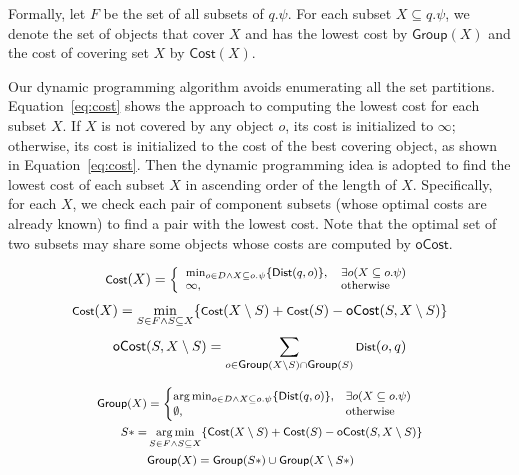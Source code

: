 \documentclass{sig-alternate}
\newcommand{\Dist}{\mbox{$\mathsf{Dist}$}\xspace}
\newcommand{\Cost}{\mbox{$\mathsf{Cost}$}}
\newcommand{\Group}{\mbox{$\mathsf{Group}$}}
\begin{document}
Formally, let $F$ be the set of all subsets of $q.\psi$.  For each
subset $X \subseteq q.\psi$, we denote the set of objects that cover
$X$ and has the lowest cost by \Group$(X)$ and the cost of covering
set $X$ by \Cost$(X)$.

Our dynamic programming algorithm avoids enumerating all the set
partitions. Equation~\ref{eq:cost} shows the approach to computing
the lowest cost for each subset $X$. If $X$ is
not covered by any object $o$, its cost is initialized to
$\infty$; otherwise, its cost is initialized to the cost of the best covering
object, as shown in Equation~\ref{eq:cost}. Then the
dynamic programming idea is adopted to find the lowest cost of each
subset $X$ in ascending order of the length of $X$. Specifically,
for each $X$, we check each pair of component subsets (whose optimal
costs are already known) to find a pair with the lowest cost. Note
that the optimal set of two subsets may share some objects whose
costs are computed by $\mathsf{oCost}$.

\vspace{-2ex}
\begin{equation}\vspace{-0.5ex} \small \label{eq:cost}
\Cost(X) = \left\{
            \begin{array}{ll}
               \min_{o \in D \wedge X
\subseteq o.\psi} \{\Dist(q, o) \}, & \exists o (X \subseteq o.\psi) \\
                   \infty, & \mathrm{otherwise}
              \end{array}
       \right.
\end{equation}
\begin{equation*}
\small
\Cost(X) =     \min_{S \in F \wedge S \subseteq X} \{\Cost(X
\setminus S) + \Cost(S) - \mathsf{oCost}(S, X \setminus S)
\}  \\
\end{equation*} \vspace{-1ex}
\begin{equation}\label{eq:ocost}
\small
\mathsf{oCost}(S, X \setminus S) = \sum_{o \in \Group(X \setminus S)
\cap \Group(S)}
\Dist(o,q)\\
\end{equation}

\begin{equation}\label{eq:group}
\small
\begin{aligned}
\mathsf{Group}(X) &=
\begin{cases}
\arg\min_{o \in D \wedge X \subseteq o.\psi} \{\Dist(q, o)
\}, & \exists o (X \subseteq o.\psi) \\
\emptyset, & \mathrm{otherwise}
\end{cases}\\
%
S* = &\mathop{\arg\min}_{S \in F \wedge S \subseteq X} \{\Cost(X
\setminus S) + \Cost(S) - \mathsf{oCost}(S, X \setminus S) \}
\\\vspace{-4ex}
\ \ \ &\mathsf{Group}(X) = \mathsf{Group}(S*) \cup
\mathsf{Group}(X \setminus S*)
\end{aligned}
\end{equation}
\end{document}
